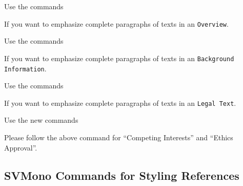\documentclass[graybox,square]{svmono}
\begin{document}
\begin{sloppy}
Use the commands

\cprotect{}

\eject

If you want to emphasize complete paragraphs of texts in an \verb|Overview|.  

Use the commands

\cprotect{}

If you want to emphasize complete paragraphs of texts in an \verb|Background| \verb|Information|.  


Use the commands

\cprotect{}

If you want to emphasize complete paragraphs of texts in an \verb|Legal Text|.  

Use the new commands

\cprotect{}

Please follow the above command for ``Competing Interests'' and
``Ethics Approval''.

\subsection{SVMono Commands for Styling References}


\end{sloppy}
\end{document}
